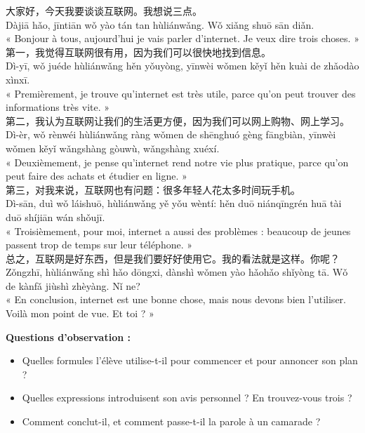 \documentclass[11pt]{article}
\begin{document}
\begin{textebox}
大家好，今天我要谈谈互联网。我想说三点。\\
Dàjiā hǎo, jīntiān wǒ yào tán tan hùliánwǎng. Wǒ xiǎng shuō sān diǎn.\\
« Bonjour à tous, aujourd'hui je vais parler d'internet. Je veux dire trois choses. »\\[4pt]
第一，我觉得互联网很有用，因为我们可以很快地找到信息。\\
Dì-yī, wǒ juéde hùliánwǎng hěn yǒuyòng, yīnwèi wǒmen kěyǐ hěn kuài de zhǎodào xìnxī.\\
« Premièrement, je trouve qu'internet est très utile, parce qu'on peut trouver des informations très vite. »\\[4pt]
第二，我认为互联网让我们的生活更方便，因为我们可以网上购物、网上学习。\\
Dì-èr, wǒ rènwéi hùliánwǎng ràng wǒmen de shēnghuó gèng fāngbiàn, yīnwèi wǒmen kěyǐ wǎngshàng gòuwù, wǎngshàng xuéxí.\\
« Deuxièmement, je pense qu'internet rend notre vie plus pratique, parce qu'on peut faire des achats et étudier en ligne. »\\[4pt]
第三，对我来说，互联网也有问题：很多年轻人花太多时间玩手机。\\
Dì-sān, duì wǒ láishuō, hùliánwǎng yě yǒu wèntí: hěn duō niánqīngrén huā tài duō shíjiān wán shǒujī.\\
« Troisièmement, pour moi, internet a aussi des problèmes : beaucoup de jeunes passent trop de temps sur leur téléphone. »\\[4pt]
总之，互联网是好东西，但是我们要好好使用它。我的看法就是这样。你呢？\\
Zǒngzhī, hùliánwǎng shì hǎo dōngxi, dànshì wǒmen yào hǎohǎo shǐyòng tā. Wǒ de kànfǎ jiùshì zhèyàng. Nǐ ne?\\
« En conclusion, internet est une bonne chose, mais nous devons bien l'utiliser. Voilà mon point de vue. Et toi ? »
\end{textebox}

\textbf{Questions d'observation :}
\begin{itemize}
\item Quelles formules l'élève utilise-t-il pour commencer et pour annoncer son plan ?
\item Quelles expressions introduisent son avis personnel ? En trouvez-vous trois ?
\item Comment conclut-il, et comment passe-t-il la parole à un camarade ?
\end{itemize}
\end{document}
